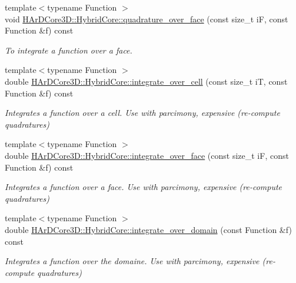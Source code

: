 \begin{DoxyCompactItemize}
\mbox{\label{group__HybridCore_gabba9f8c9be9f2006a441304054b955c6}} 
{\footnotesize template$<$typename Function $>$ }\\void \hyperlink{group__HybridCore_gabba9f8c9be9f2006a441304054b955c6}{H\+Ar\+D\+Core3\+D\+::\+Hybrid\+Core\+::quadrature\+\_\+over\+\_\+face} (const size\+\_\+t iF, const Function \&f) const
\begin{DoxyCompactList}\small\item\em To integrate a function over a face. \end{DoxyCompactList}\item 
\mbox{\label{group__HybridCore_ga1cb893746a3e8bdb80500be5c9382d96}} 
{\footnotesize template$<$typename Function $>$ }\\double \hyperlink{group__HybridCore_ga1cb893746a3e8bdb80500be5c9382d96}{H\+Ar\+D\+Core3\+D\+::\+Hybrid\+Core\+::integrate\+\_\+over\+\_\+cell} (const size\+\_\+t iT, const Function \&f) const
\begin{DoxyCompactList}\small\item\em Integrates a function over a cell. Use with parcimony, expensive (re-\/compute quadratures) \end{DoxyCompactList}\item 
\mbox{\label{group__HybridCore_gacb6ad78c453a5a5ec6bc91d7a14e4c2a}} 
{\footnotesize template$<$typename Function $>$ }\\double \hyperlink{group__HybridCore_gacb6ad78c453a5a5ec6bc91d7a14e4c2a}{H\+Ar\+D\+Core3\+D\+::\+Hybrid\+Core\+::integrate\+\_\+over\+\_\+face} (const size\+\_\+t iF, const Function \&f) const
\begin{DoxyCompactList}\small\item\em Integrates a function over a face. Use with parcimony, expensive (re-\/compute quadratures) \end{DoxyCompactList}\item 
\mbox{\label{group__HybridCore_gad6aeaa4f65c67b92307c273254f539ed}} 
{\footnotesize template$<$typename Function $>$ }\\double \hyperlink{group__HybridCore_gad6aeaa4f65c67b92307c273254f539ed}{H\+Ar\+D\+Core3\+D\+::\+Hybrid\+Core\+::integrate\+\_\+over\+\_\+domain} (const Function \&f) const
\begin{DoxyCompactList}\small\item\em Integrates a function over the domaine. Use with parcimony, expensive (re-\/compute quadratures) \end{DoxyCompactList}\item 

\end{DoxyCompactItemize}
